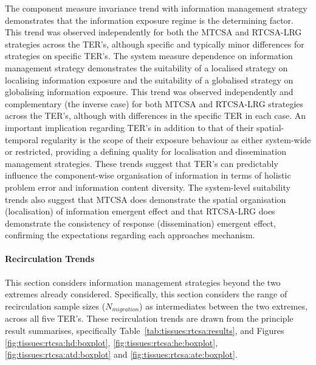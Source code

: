 The component measure invariance trend with information management strategy demonstrates that the information exposure regime is the determining factor. This trend was observed independently for both the MTCSA and RTCSA-LRG strategies across the TER's, although specific and typically minor differences for strategies on specific TER's.
The system measure dependence on information management strategy demonstrates the suitability of a localised strategy on localising information exposure and the suitability of a globalised strategy on globalising information exposure. This trend was observed independently and complementary (the inverse case) for both MTCSA and RTCSA-LRG strategies across the TER's, although with differences in the specific TER in each case.
An important implication regarding TER's in addition to that of their spatial-temporal regularity is the scope of their exposure behaviour as either system-wide or restricted, providing a defining quality for localisation and dissemination management strategies.
These trends suggest that TER's can predictably influence the component-wise organisation of information in terms of holistic problem error and information content diversity. The system-level suitability trends also suggest that MTCSA does demonstrate the spatial organisation (localisation) of information emergent effect and that RTCSA-LRG does demonstrate the consistency of response (dissemination) emergent effect, confirming the expectations regarding each approaches mechanism. 

%
%
\paragraph{Recirculation Trends}
This section considers information management strategies beyond the two extremes already considered. Specifically, this section considers the range of recirculation sample sizes ($N_{migration}$) as intermediates between the two extremes, across all five TER's. These recirculation trends are drawn from the principle result summarises, specifically Table~\ref{tab:tissues:rtcsa:results}, and Figures \ref{fig:tissues:rtcsa:hd:boxplot}, \ref{fig:tissues:rtcsa:he:boxplot}, \ref{fig:tissues:rtcsa:atd:boxplot} and \ref{fig:tissues:rtcsa:ate:boxplot}. 

